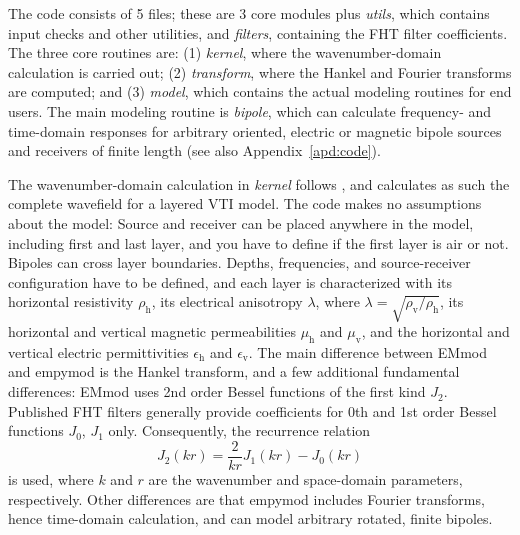 \documentclass[manuscript,revised]{geophysics}
\begin{document}
The code consists of 5 files; these are 3 core modules plus \emph{utils}, which
contains input checks and other utilities, and \emph{filters}, containing the
FHT filter coefficients. The three core routines are: (1) \emph{kernel}, where
the wavenumber-domain calculation is carried out; (2) \emph{transform}, where
the Hankel and Fourier transforms are computed; and (3) \emph{model}, which
contains the actual modeling routines for end users. The main modeling routine
is \emph{bipole}, which can calculate frequency- and time-domain responses for
arbitrary oriented, electric or magnetic bipole sources and receivers of finite
length (see also Appendix~\ref{apd:code}).

The wavenumber-domain calculation in \emph{kernel} follows
\cite{GEO.15.Hunziker}, and calculates as such the complete wavefield for a
layered VTI model. The code makes no assumptions about the model: Source and
receiver can be placed anywhere in the model, including first and last layer,
and you have to define if the first layer is air or not. Bipoles can cross
layer boundaries. Depths, frequencies, and source-receiver configuration have
to be defined, and each layer is characterized with its horizontal resistivity
$\rho_\textrm{h}$, its electrical anisotropy $\lambda$, where $\lambda =
\sqrt{\rho_\textrm{v}/\rho_\textrm{h}}$, its horizontal and vertical magnetic
permeabilities $\mu_\mathrm{h}$ and $\mu_\mathrm{v}$, and the horizontal and
vertical electric permittivities $\epsilon_\mathrm{h}$ and
$\epsilon_\mathrm{v}$. The main difference between EMmod and empymod is the
Hankel transform, and a few additional fundamental differences: EMmod uses 2nd
order Bessel functions of the first kind $J_2$. Published FHT filters generally
provide coefficients for 0th and 1st order Bessel functions $J_0$, $J_1$ only.
Consequently, the recurrence relation
%
\begin{equation}
  J_2(kr) = \frac{2}{kr}J_1(kr) - J_0(kr)
  \label{eq:j2}
\end{equation}
%
is used, where $k$ and $r$ are the wavenumber and space-domain parameters,
respectively. Other differences are that empymod includes Fourier transforms,
hence time-domain calculation, and can model arbitrary rotated, finite bipoles.
\end{document}
